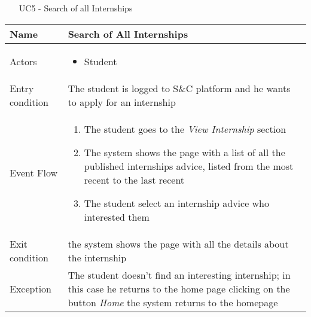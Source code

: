 				\begin{table} [H]
					\centering
					\begin{itemize}
						\item [UC5] - Search of all Internships
					\end{itemize}
					\begin{tabular}{|| P{7.5cm} | P{7.5cm} ||}
						\hline
						Name & Search of All Internships \\
						\hline
						Actors & \parbox{5cm}{\begin{itemize}
								\item Student
							\end{itemize}
						} \\
						\hline
						Entry condition & The student is logged to S\&C platform and he wants to apply for an internship  \\
						\hline
						Event Flow & \parbox{5cm}{\begin{enumerate}
								\item The student goes to the \textit{View Internship} section
								\item The system shows the page with a 
								list of all the published internships advice, 
								listed from the most recent to the 
								last recent  
								\item The student select an internship advice who interested them
						\end{enumerate}} \\
						\hline 
						Exit condition &  the system shows the 
						page with all the details about the 
						internship \\
						\hline
						Exception & The student doesn’t find an interesting 
						internship; in this case he returns to the 
						home page clicking on the button \textit{Home}
						the system returns to the homepage 
						 \\
						\hline
					\end{tabular}
				\end{table}
				
				
				
